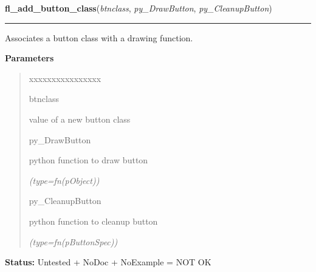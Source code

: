     \label{xformslib:library:fl_add_button_class}

    \vspace{0.5ex}

\hspace{.8\funcindent}\begin{boxedminipage}{\funcwidth}

    \raggedright \textbf{fl\_add\_button\_class}(\textit{btnclass}, \textit{py\_DrawButton}, \textit{py\_CleanupButton})

    \vspace{-1.5ex}

    \rule{\textwidth}{0.5\fboxrule}
\setlength{\parskip}{2ex}
    Associates a button class with a drawing function.

\setlength{\parskip}{1ex}
      \textbf{Parameters}
      \vspace{-1ex}

      \begin{quote}
        \begin{Ventry}{xxxxxxxxxxxxxxxx}

          \item[btnclass]

          value of a new button class

          \item[py\_DrawButton]

          python function to draw button

            {\it (type=fn(pObject))}

          \item[py\_CleanupButton]

          python function to cleanup button

            {\it (type=fn(pButtonSpec))}

        \end{Ventry}

      \end{quote}

\textbf{Status:} Untested + NoDoc + NoExample = NOT OK



    \end{boxedminipage}

    \label{xformslib:library:fl_set_button_mouse_buttons}

